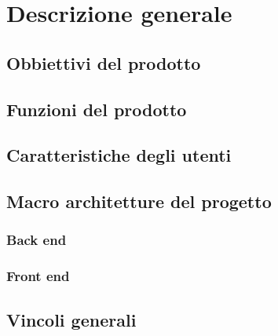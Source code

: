 
\section{Descrizione generale}
\subsection{Obbiettivi del prodotto}
\subsection{Funzioni del prodotto}
\subsection{Caratteristiche degli utenti}
\subsection{Macro architetture del progetto}
\subsubsection{Back end}
\subsubsection{Front end}
\subsection{Vincoli generali}




